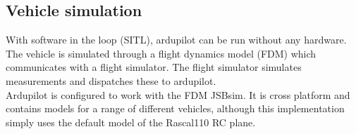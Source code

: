 \subsection{Vehicle simulation}
    With software in the loop (SITL), ardupilot can be run without any hardware. The vehicle is simulated through a flight dynamics model (FDM) which communicates with a flight simulator. The flight simulator simulates measurements and dispatches these to ardupilot.\\
    
    
    Ardupilot is configured to work with the FDM JSBsim. It is cross platform and contains models for a range of different vehicles, although this implementation simply uses the default model of the Rascal110 RC plane. 
    
    
    

